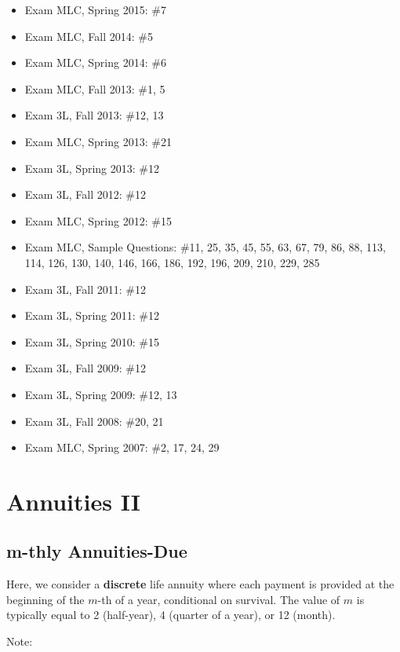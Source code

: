 \documentclass[]{book}
\begin{document}
\begin{itemize}
\item
  Exam MLC, Spring 2015: \#7
\item
  Exam MLC, Fall 2014: \#5
\item
  Exam MLC, Spring 2014: \#6
\item
  Exam MLC, Fall 2013: \#1, 5
\item
  Exam 3L, Fall 2013: \#12, 13
\item
  Exam MLC, Spring 2013: \#21
\item
  Exam 3L, Spring 2013: \#12
\item
  Exam 3L, Fall 2012: \#12
\item
  Exam MLC, Spring 2012: \#15
\item
  Exam MLC, Sample Questions: \#11, 25, 35, 45, 55, 63, 67, 79, 86, 88,
  113, 114, 126, 130, 140, 146, 166, 186, 192, 196, 209, 210, 229, 285
\item
  Exam 3L, Fall 2011: \#12
\item
  Exam 3L, Spring 2011: \#12
\item
  Exam 3L, Spring 2010: \#15
\item
  Exam 3L, Fall 2009: \#12
\item
  Exam 3L, Spring 2009: \#12, 13
\item
  Exam 3L, Fall 2008: \#20, 21
\item
  Exam MLC, Spring 2007: \#2, 17, 24, 29
\end{itemize}

\chapter{Annuities II}\label{annuities-ii}

\section{m-thly Annuities-Due}\label{m-thly-annuities-due}

Here, we consider a \textbf{discrete} life annuity where each payment is
provided at the beginning of the \(m\)-th of a year, conditional on
survival. The value of \(m\) is typically equal to 2 (half-year), 4
(quarter of a year), or 12 (month).

Note:
\end{document}
